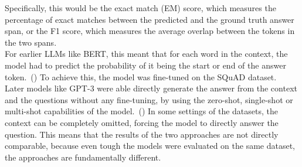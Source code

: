Specifically, this would be the exact match (EM) score, which measures the percentage of exact matches between the predicted and the ground truth answer span, or the F1 score, which measures the average overlap between the tokens in the two spans.
\\
For earlier LLMs like BERT, this meant that for each word in the context, the model had to predict the probability of it being the start or end of the answer token.~(\cite{devlin:2018})
To achieve this, the model was fine-tuned on the SQuAD dataset. 
\\
Later models like GPT-3 were able directly generate the answer from the context and the questions without any fine-tuning, by using the zero-shot, single-shot or multi-shot capabilities of the model.~(\cite{brown:2020})
In some settings of the datasets, the context can be completely omitted, forcing the model to directly answer the question.
This means that the results of the two approaches are not directly comparable, because even tough the models were evaluated on the same dataset, the approaches are fundamentally different.

